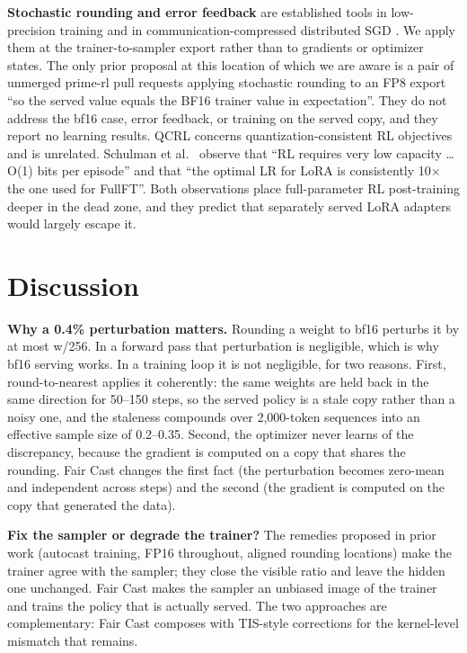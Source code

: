 \documentclass[
  10pt,
]{article}
\begin{document}
\textbf{Stochastic rounding and error feedback} are established tools in low-precision training
\cite{r9} and in communication-compressed distributed SGD \cite{r10,r11,r12}. We apply them at the
trainer-to-sampler export rather than to gradients or optimizer states. The only prior proposal at
this location of which we are aware is a pair of unmerged prime-rl pull requests \cite{r13} applying
stochastic rounding to an FP8 export ``so the served value equals the BF16 trainer value in
expectation''. They do not address the bf16 case, error feedback, or training on the served copy,
and they report no learning results. QCRL \cite{r20} concerns quantization-consistent RL objectives
and is unrelated. Schulman et al.~\cite{r14} observe that ``RL requires very low capacity \ldots{}
O(1) bits per episode'' and that ``the optimal LR for LoRA is consistently 10× the one used for
FullFT''. Both observations place full-parameter RL post-training deeper in the dead zone, and they
predict that separately served LoRA adapters would largely escape it.

\section{Discussion}\label{discussion}

\textbf{Why a 0.4\% perturbation matters.} Rounding a weight to bf16 perturbs it by at most
\textbar w\textbar/256. In a forward pass that perturbation is negligible, which is why bf16 serving
works. In a training loop it is not negligible, for two reasons. First, round-to-nearest applies it
coherently: the same weights are held back in the same direction for 50--150 steps, so the served
policy is a stale copy rather than a noisy one, and the staleness compounds over 2,000-token
sequences into an effective sample size of 0.2--0.35. Second, the optimizer never learns of the
discrepancy, because the gradient is computed on a copy that shares the rounding. Fair Cast changes
the first fact (the perturbation becomes zero-mean and independent across steps) and the second (the
gradient is computed on the copy that generated the data).

\textbf{Fix the sampler or degrade the trainer?} The remedies proposed in prior work (autocast
training, FP16 throughout, aligned rounding locations) make the trainer agree with the sampler; they
close the visible ratio and leave the hidden one unchanged. Fair Cast makes the sampler an unbiased
image of the trainer and trains the policy that is actually served. The two approaches are
complementary: Fair Cast composes with TIS-style corrections for the kernel-level mismatch that
remains.
\end{document}
